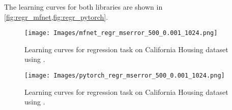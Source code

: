 The learning curves for both libraries are shown in \cref{fig:regr_mfnet,fig:regr_pytorch}.

\begin{figure}
    \centering
    \texttt{[image: Images/mfnet\_regr\_mserror\_500\_0.001\_1024.png]}
    \caption{Learning curves for regression task on California Housing dataset using \mfnet.}
    \label{fig:regr_mfnet}
\end{figure}

\begin{figure}
    \centering
    \texttt{[image: Images/pytorch\_regr\_mserror\_500\_0.001\_1024.png]}
    \caption{Learning curves for regression task on California Housing dataset using \pytorch.}
    \label{fig:regr_pytorch}
\end{figure}
